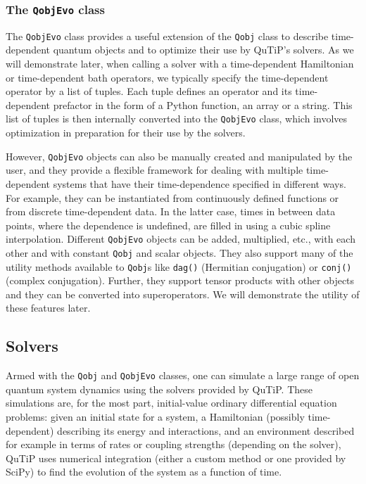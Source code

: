 \documentclass[preprint,3p,sort&compress]{elsarticle}
\def\code#1{\texttt{#1}}
\begin{document}

\subsubsection{The \textup{\code{QobjEvo}} class}
The \code{QobjEvo} class provides a useful extension of the \code{Qobj} class to describe time-dependent quantum objects and to optimize their use by QuTiP's solvers. As we will demonstrate later, when calling a solver with a time-dependent Hamiltonian or time-dependent bath operators, we typically specify the time-dependent operator by a list of tuples. Each tuple defines an operator and its time-dependent prefactor in the form of a Python function, an array or a string. This list of tuples is then internally converted into the \code{QobjEvo} class, which involves optimization in preparation for their use by the solvers.  

However, \code{QobjEvo} objects can also be manually created and manipulated by the user, and they provide a flexible framework for dealing with multiple time-dependent systems that have their time-dependence specified in different ways. For example, they can be instantiated from continuously defined functions or from discrete time-dependent data. In the latter case, times in between data points, where the dependence is undefined, are filled in using a cubic spline interpolation.  Different \code{QobjEvo} objects can be added, multiplied, etc., with each other and with constant \code{Qobj} and scalar objects.  They also support many of the utility methods available to \code{Qobj}s like \code{dag()} (Hermitian conjugation) or \code{conj()} (complex conjugation). Further, they support tensor products with other objects and they can be converted into superoperators. We will demonstrate the utility of these features later.



\subsection{Solvers}

Armed with the \code{Qobj}  and \code{QobjEvo} classes, one can simulate a large range of open quantum system dynamics using the solvers provided by QuTiP.  These simulations are, for the most part, initial-value ordinary differential equation problems: given an initial state for a system, a Hamiltonian (possibly time-dependent) describing its energy and interactions, and an environment described for example in terms of rates or coupling strengths (depending on the solver), QuTiP uses numerical integration (either a custom method or one provided by SciPy) to find the evolution of the system as a function of time. 
\end{document}
